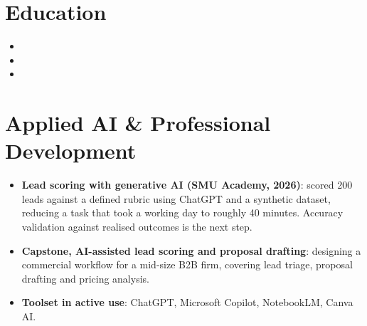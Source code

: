 \documentclass[11pt,a4paper,sans]{moderncv}
\begin{document}

\section{Education}
\vspace{1pt}
\begin{itemize}

\item{}

\vspace{3pt}

\item{}

\vspace{3pt}

\item{}

\end{itemize}


\section{Applied AI \& Professional Development}
\vspace{1pt}
\begin{itemize}

\item \textbf{Lead scoring with generative AI (SMU Academy, 2026)}: scored 200 leads against a defined rubric using ChatGPT and a synthetic dataset, reducing a task that took a working day to roughly 40 minutes. Accuracy validation against realised outcomes is the next step.

\item \textbf{Capstone, AI-assisted lead scoring and proposal drafting}: designing a commercial workflow for a mid-size B2B firm, covering lead triage, proposal drafting and pricing analysis.

\item \textbf{Toolset in active use}: ChatGPT, Microsoft Copilot, NotebookLM, Canva AI.

\end{itemize}
\end{document}
